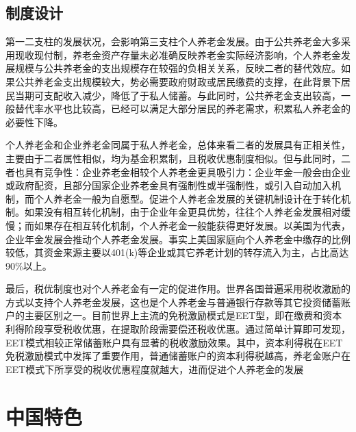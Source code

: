 \documentclass[a4paper,zihao=5]{ctexart}
\begin{document}
\subsection{制度设计}
第一二支柱的发展状况，会影响第三支柱个人养老金发展。由于公共养老金大多采用现收现付制，养老金资产存量未必准确反映养老金实际经济影响，个人养老金发展规模与公共养老金的支出规模存在较强的负相关关系，反映二者的替代效应。如果公共养老金支出规模较大，势必需要政府财政或居民缴费的支撑，在此背景下居民当期可支配收入减少，降低了于私人储蓄。与此同时，公共养老金支出较高，一般替代率水平也比较高，已经可以满足大部分居民的养老需求，积累私人养老金的必要性下降。

个人养老金和企业养老金同属于私人养老金，总体来看二者的发展具有正相关性，主要由于二者属性相似，均为基金积累制，且税收优惠制度相似。但与此同时，二者也具有竞争性：企业养老金相较个人养老金更具吸引力：企业年金一般会由企业或政府配资，且部分国家企业养老金具有强制性或半强制性，或引入自动加入机制，而个人养老金一般为自愿型。促进个人养老金发展的关键机制设计在于转化机制。如果没有相互转化机制，由于企业年金更具优势，往往个人养老金发展相对缓慢；而如果存在相互转化机制，个人养老金一般能获得更好发展。以美国为代表，企业年金发展会推动个人养老金发展。事实上美国家庭向个人养老金中缴存的比例较低，其资金来源主要以401(k)等企业或其它养老计划的转存流入为主，占比高达90\%以上。

最后，税优制度也对个人养老金有一定的促进作用。世界各国普遍采用税收激励的方式以支持个人养老金发展，这也是个人养老金与普通银行存款等其它投资储蓄账户的主要区别之一。目前世界上主流的免税激励模式是EET型，即在缴费和资本利得阶段享受税收优惠，在提取阶段需要偿还税收优惠。通过简单计算即可发现，EET模式相较正常储蓄账户具有显著的税收激励效果。其中，资本利得税在EET免税激励模式中发挥了重要作用，普通储蓄账户的资本利得税越高，养老金账户在EET模式下所享受的税收优惠程度就越大，进而促进个人养老金的发展

\section{中国特色}
\end{document}
